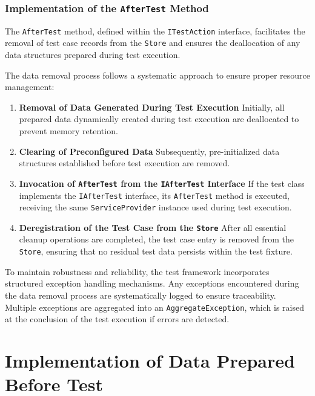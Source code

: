 \subsubsection{Implementation of the \texttt{AfterTest} Method}

The \texttt{AfterTest} method, defined within the \texttt{ITestAction} interface, facilitates the removal of test case records from the \texttt{Store} and ensures the deallocation of any data structures prepared during test execution.

The data removal process follows a systematic approach to ensure proper resource management:

\begin{enumerate}

    \item \textbf{Removal of Data Generated During Test Execution}  
        Initially, all prepared data dynamically created during test execution are deallocated to prevent memory retention.

    \item \textbf{Clearing of Preconfigured Data}  
        Subsequently, pre-initialized data structures established before test execution are removed.

    \item \textbf{Invocation of \texttt{AfterTest} from the \texttt{IAfterTest} Interface}  
        If the test class implements the \texttt{IAfterTest} interface, its \texttt{AfterTest} method is executed, receiving the same \texttt{ServiceProvider} instance used during test execution.

    \item \textbf{Deregistration of the Test Case from the \texttt{Store}}  
        After all essential cleanup operations are completed, the test case entry is removed from the \texttt{Store}, ensuring that no residual test data persists within the test fixture.
\end{enumerate}

To maintain robustness and reliability, the test framework incorporates structured exception handling mechanisms. Any exceptions encountered during the data removal process are systematically logged to ensure traceability. Multiple exceptions are aggregated into an \texttt{AggregateException}, which is raised at the conclusion of the test execution if errors are detected.

\section{Implementation of Data Prepared Before Test}

